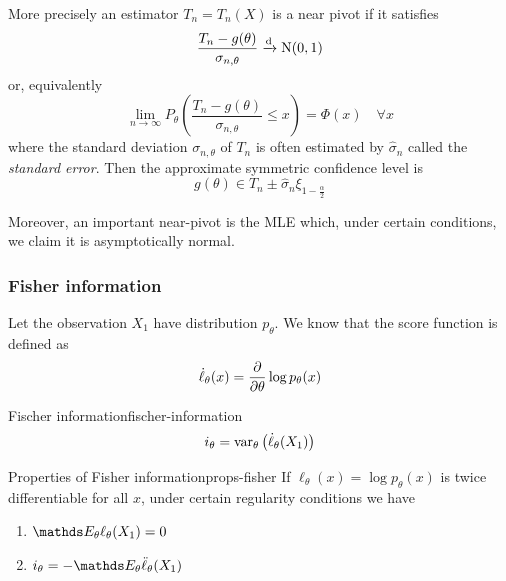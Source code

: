 \documentclass[12pt]{extarticle}
\newcommand{\Normal}{{\operatorfont N}}
\newcommand{\convdist}{\xrightarrow{\operatorfont d}}
\begin{document}
More precisely an estimator $T_n = T_n(X)$ is a near pivot if it satisfies
\begin{equation}
	\frac{T_n - g(\theta)}{\sigma_{n, \theta}} \convdist \Normal(0,1)
\end{equation}
or, equivalently
\begin{equation}
	\lim_{n \to \infty} P_\theta \left( \frac{T_n - g(\theta)}{\sigma_{n, \theta}} \leq x \right) = \Phi(x) \quad \forall x
\end{equation}
where the standard deviation $\sigma_{n, \theta}$ of $T_n$ is often estimated by $\hat \sigma_n$ called the \emph{standard error}.
Then the approximate symmetric confidence level is
\begin{equation}
	g(\theta) \in T_n \pm \hat \sigma_n \xi_{1-\frac{\alpha}{2}}
\end{equation}

Moreover, an important near-pivot is the MLE which, under certain conditions, we claim it is asymptotically normal.

\subsubsection{Fisher information}

Let the observation $X_1$ have distribution $p_\theta$.
We know that the score function is defined as
\begin{equation}
	\dot \ell_\theta (x) = \pdv{}{\theta} \log p_\theta(x)
\end{equation}

\begin{definition}{Fischer information}{fischer-information}
	\begin{equation}
		i_\theta = \var_\theta \left(\dot \ell_\theta (X_1)\right)
	\end{equation}
\end{definition}

\begin{proposition}{Properties of Fisher information}{props-fisher}
	If $\ell_\theta(x) = \log p_\theta(x)$ is twice differentiable for all $x$, under certain regularity conditions we have
	\begin{enumerate}[label=\roman*.]
		\item $\E_\theta \ell_\theta (X_1) = 0$
		\item $i_\theta = -\E_\theta \ddot\ell_\theta(X_1)$
	\end{enumerate}
\end{proposition}
\end{document}
